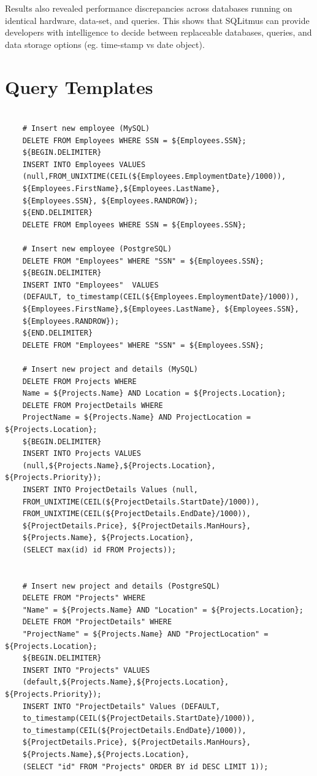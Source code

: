 \documentclass[12pt]{article}
\begin{document}
\begin{spacing}{1.9}
	Results also revealed performance discrepancies across databases running on identical hardware, data-set, and queries. This shows that SQLitmus can provide developers with intelligence to decide between replaceable databases, queries, and data storage options (eg. time-stamp vs date object).
	
	\printbibliography
	
	\appendix
	
	\section{ Query Templates}
	
	\begin{verbatim}
	
	# Insert new employee (MySQL)
	DELETE FROM Employees WHERE SSN = ${Employees.SSN};
	${BEGIN.DELIMITER}
	INSERT INTO Employees VALUES 
	(null,FROM_UNIXTIME(CEIL(${Employees.EmploymentDate}/1000)),
	${Employees.FirstName},${Employees.LastName}, 
	${Employees.SSN}, ${Employees.RANDROW});
	${END.DELIMITER}
	DELETE FROM Employees WHERE SSN = ${Employees.SSN};
	
	# Insert new employee (PostgreSQL)
	DELETE FROM "Employees" WHERE "SSN" = ${Employees.SSN};
	${BEGIN.DELIMITER}
	INSERT INTO "Employees"  VALUES 
	(DEFAULT, to_timestamp(CEIL(${Employees.EmploymentDate}/1000)),
	${Employees.FirstName},${Employees.LastName}, ${Employees.SSN}, 
	${Employees.RANDROW});
	${END.DELIMITER}
	DELETE FROM "Employees" WHERE "SSN" = ${Employees.SSN};
	
	# Insert new project and details (MySQL)
	DELETE FROM Projects WHERE 
	Name = ${Projects.Name} AND Location = ${Projects.Location};
	DELETE FROM ProjectDetails WHERE 
	ProjectName = ${Projects.Name} AND ProjectLocation = ${Projects.Location};
	${BEGIN.DELIMITER}
	INSERT INTO Projects VALUES 
	(null,${Projects.Name},${Projects.Location}, ${Projects.Priority});
	INSERT INTO ProjectDetails Values (null, 
	FROM_UNIXTIME(CEIL(${ProjectDetails.StartDate}/1000)), 
	FROM_UNIXTIME(CEIL(${ProjectDetails.EndDate}/1000)),
	${ProjectDetails.Price}, ${ProjectDetails.ManHours}, 
	${Projects.Name}, ${Projects.Location},
	(SELECT max(id) id FROM Projects));
	
	
	# Insert new project and details (PostgreSQL)
	DELETE FROM "Projects" WHERE 
	"Name" = ${Projects.Name} AND "Location" = ${Projects.Location};
	DELETE FROM "ProjectDetails" WHERE 
	"ProjectName" = ${Projects.Name} AND "ProjectLocation" = ${Projects.Location};
	${BEGIN.DELIMITER}
	INSERT INTO "Projects" VALUES 
	(default,${Projects.Name},${Projects.Location}, ${Projects.Priority});
	INSERT INTO "ProjectDetails" Values (DEFAULT, 
	to_timestamp(CEIL(${ProjectDetails.StartDate}/1000)), 
	to_timestamp(CEIL(${ProjectDetails.EndDate}/1000)),
	${ProjectDetails.Price}, ${ProjectDetails.ManHours}, 
	${Projects.Name},${Projects.Location}, 
	(SELECT "id" FROM "Projects" ORDER BY id DESC LIMIT 1));
	

\end{verbatim}
\end{spacing}
\end{document}
